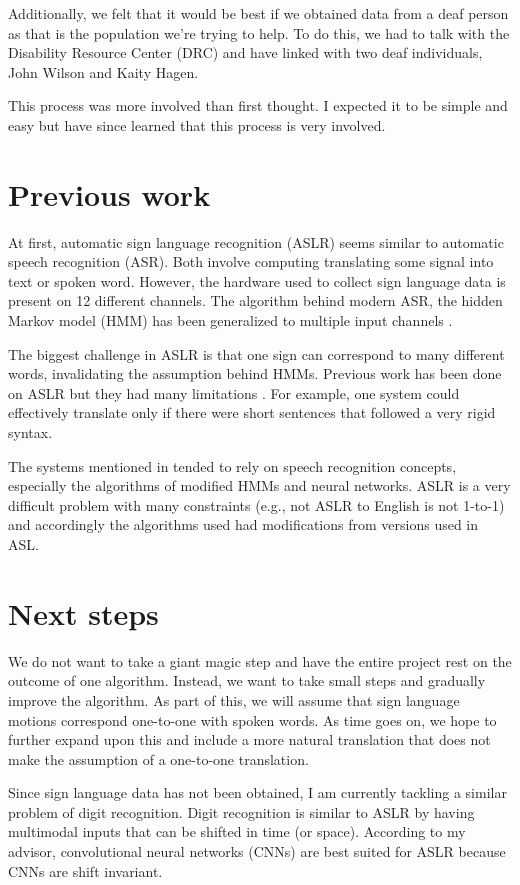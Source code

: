 Additionally, we felt that it would be best if we obtained data from a deaf person as that is the population we're trying to help. To do this, we had to talk with the Disability Resource Center (DRC) and have linked with two deaf individuals, John Wilson and Kaity Hagen.

This process was more involved than first thought. I expected it to be simple and easy but have since learned that this process is very involved.

\section{Previous work}
At first, automatic sign language recognition (ASLR) seems similar to automatic speech recognition (ASR). Both involve computing translating some signal into text or spoken word. However, the hardware used to collect sign language data is present on 12 different channels. The algorithm behind modern ASR, the hidden Markov model (HMM) has been generalized to multiple input channels \cite{bengio2004multimodal}.

The biggest challenge in ASLR is that one sign can correspond to many different words, invalidating the assumption behind HMMs. Previous work has been done on ASLR but they had many limitations \cite{ong2005automatic}. For example, one system could effectively translate only if there were short sentences that followed a very rigid syntax.

The systems mentioned in \cite{ong2005automatic} tended to rely on speech recognition concepts, especially the algorithms of modified HMMs and neural networks. ASLR is a very difficult problem with many constraints (e.g., not ASLR to English is not 1-to-1) and accordingly the algorithms used had modifications from versions used in ASL.

\section{Next steps}
We do not want to take a giant magic step and have the entire project rest on the outcome of one algorithm. Instead, we want to take small steps and gradually improve the algorithm. As part of this, we will assume that sign language motions correspond one-to-one with spoken words. As time goes on, we hope to further expand upon this and include a more natural translation that does not make the assumption of a one-to-one translation.

Since sign language data has not been obtained, I am currently tackling a similar problem of digit recognition. Digit recognition is similar to ASLR by having multimodal inputs that can be shifted in time (or space). According to my advisor, convolutional neural networks (CNNs) are best suited for ASLR because CNNs are shift invariant.

